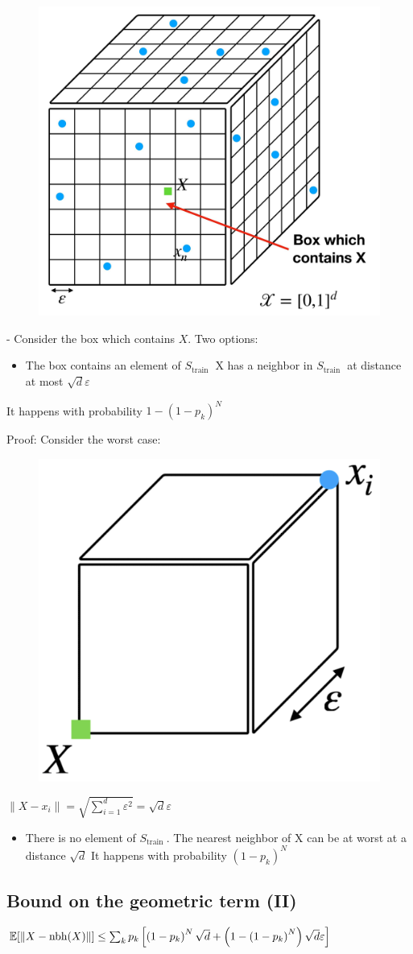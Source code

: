 \begin{figure} 
    \centering
    \includegraphics[width=0.4\columnwidth]{figures/dim_hypercube.jpg}
\end{figure}


- Consider the box which contains $X$. Two options:


\begin{itemize}
  \item The box contains an element of $S_{\text {train }}$ X has a neighbor in $S_{\text {train }}$ at distance at most $\sqrt{d} \varepsilon$
\end{itemize}

It happens with probability $1-\left(1-p_{k}\right)^{N}$

Proof: Consider the worst case: 

\begin{figure} 
    \centering
    \includegraphics[width=0.2\columnwidth]{figures/dim_worst_case.png}
\end{figure}

$
\left\|X-x_{i}\right\|=\sqrt{\sum_{i=1}^{d} \varepsilon^{2}}=\sqrt{d} \varepsilon
$

\begin{itemize}
  \item There is no element of $S_{\text {train }}$. The nearest neighbor of $\mathrm{X}$ can be at worst at a distance $\sqrt{d}$ It happens with probability $\left(1-p_{k}\right)^{N}$
\end{itemize}



\subsection*{Bound on the geometric term (II)}
$\mathbb{E}[\|X-\mathrm{nbh}(X)\|] \\\leq \sum_{k} p_{k}\left[\left(1-p_{k}\right)^{N} \sqrt{d}+\left(1-\left(1-p_{k}\right)^{N}\right) \sqrt{d} \varepsilon\right]$

